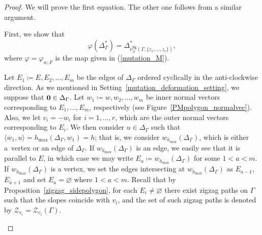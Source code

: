 \documentclass[11pt]{article}
\numberwithin{equation}{section}
\numberwithin{equation}{section}
\numberwithin{figure}{section}
\numberwithin{table}{section}
\newcommand{\calX}{\mathcal{X}}
\newcommand{\calZ}{\mathcal{Z}}
\newcommand{\zig}{\mathsf{zig}}
\begin{document}
\begin{proof}We will prove the first equation. The other one follows from a similar argument.

First, we show that
\begin{displaymath}
\varphi(\Delta_\Gamma^*)=\Delta_{\nu^\zig_\calX(\Gamma,\{z_1,\dots,z_r\})}^*,
\end{displaymath}
where $\varphi=\varphi_{w,F}$ is the map given in (\ref{mutation_M}).

Let $E_1\coloneqq E, E_2,\dots,E_m$ be the edges of $\Delta_\Gamma$ ordered cyclically in the anti-clockwise direction.
As we mentioned in Setting~\ref{mutation_deformation_setting}, we suppose that ${\bf 0}\in\Delta_\Gamma$.
Let $w_1\coloneqq w,w_2, \dots, w_m$ be inner normal vectors corresponding to $E_1,\dots,E_m$, respectively (see Figure~\ref{PMpolygon_normalvec}).
Also, we let $v_i=-w_i$ for $i=1,\dots,r$, which are the outer normal vectors corresponding to $E_i$.
We then consider $u\in\Delta_\Gamma$ such that $\langle w_1,u\rangle=h_{\max}(\Delta_\Gamma,w_1)=h$; that is, we consider $w_{h_{\max}}(\Delta_\Gamma)$, which is either a~vertex or an edge of $\Delta_\Gamma$.
If $w_{h_{\max}}(\Delta_\Gamma)$ is an edge, we easily see that it is parallel to $E$, in which case we may write $E_a\coloneqq w_{h_{\max}}(\Delta_\Gamma)$ for some $1<a<m$.
If $w_{h_{\max}}(\Delta_\Gamma)$ is a vertex, we set the edges intersecting at $w_{h_{\max}}(\Delta_\Gamma)$ as $E_{a-1}$, $E_{a+1}$ and set $E_a=\varnothing$ where $1<a<m$.
Recall that by Proposition~\ref{zigzag_sidepolygon}, for each $E_i\neq\varnothing$ there exist zigzag paths on $\Gamma$ such that the slopes coincide with $v_i$,
and the set of such zigzag paths is denoted by $\calZ_{v_i}=\calZ_{v_i}(\Gamma)$.

\begin{figure}[h!]\centering
{}
\end{figure}
\end{proof}
\end{document}
